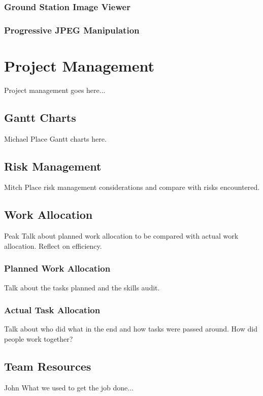 \documentclass[oneside]{ecsgdp}         %
\begin{document}
\subsection{Ground Station Image Viewer}

\subsection{Progressive JPEG Manipulation}

\chapter{Project Management}
Project management goes here...

\section{Gantt Charts}
Michael
Place Gantt charts here.

\section{Risk Management}
Mitch
Place risk management considerations and compare with risks encountered.

\section{Work Allocation}
Peak
Talk about planned work allocation to be compared with actual work allocation. Reflect on efficiency.

\subsection{Planned Work Allocation}
Talk about the tasks planned and the skills audit.

\subsection{Actual Task Allocation}
Talk about who did what in the end and how tasks were passed around. How did people work together?

\section{Team Resources}
John
What we used to get the job done...
\end{document}
